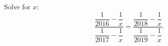 Solve for $x$:
\[
\dfrac{\dfrac{1}{2016}-\dfrac{1}{x}}{\dfrac{1}{2017}-\dfrac{1}{x}}=\dfrac{\dfrac{1}{2018}-\dfrac{1}{x}}{\dfrac{1}{2019}-\dfrac{1}{x}} .
\]
